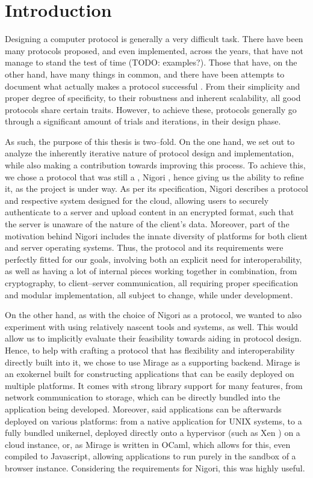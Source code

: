 \chapter{Introduction} \label{chapter:introduction}
\setcounter{page}{1}

Designing a computer protocol is generally a very difficult task.
There have been many protocols proposed, and even implemented, across the years, that have not manage to stand the test of time (TODO: examples?).
Those that have, on the other hand, have many things in common, and there have been attempts to document what actually makes a protocol successful \cite{RFC5218}.
From their simplicity and proper degree of specificity, to their robustness and inherent scalability, all good protocols share certain traits.
However, to achieve these, protocols generally go through a significant amount of trials and iterations, in their design phase.

As such, the purpose of this thesis is two--fold.
On the one hand, we set out to analyze the inherently iterative nature of protocol design and implementation, while also making a contribution towards improving this process.
To achieve this, we chose a protocol that was still a \wip, Nigori \cite{NigoriDraft}, hence giving us the ability to refine it, as the project is under way.
As per its specification, Nigori describes a protocol and respective system designed for the cloud, allowing users to securely authenticate to a server and upload content in an encrypted format, such that the server is unaware of the nature of the client's data.
Moreover, part of the motivation behind Nigori includes the innate diversity of platforms for both client and server operating systems.
Thus, the protocol and its requirements were perfectly fitted for our goals, involving both an explicit need for interoperability, as well as having a lot of internal pieces working together in combination, from cryptography, to client--server communication, all requiring proper specification and modular implementation, all subject to change, while under development.

On the other hand, as with the choice of Nigori as a protocol, we wanted to also experiment with using relatively nascent tools and systems, as well.
This would allow us to implicitly evaluate their feasibility towards aiding in protocol design.
Hence, to help with crafting a protocol that has flexibility and interoperability directly built into it, we chose to use Mirage \cite{Mirage} as a supporting backend.
Mirage is an exokernel built for constructing applications that can be easily deployed on multiple platforms.
It comes with strong library support for many features, from network communication to storage, which can be directly bundled into the application being developed.
Moreover, said applications can be afterwards deployed on various platforms: from a native application for UNIX systems, to a fully bundled unikernel, deployed directly onto a hypervisor (such as Xen \cite{Xen}) on a cloud instance, or, as Mirage is written in OCaml, which allows for this, even compiled to Javascript, allowing applications to run purely in the sandbox of a browser instance.
Considering the requirements for Nigori, this was highly useful.

